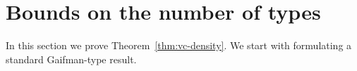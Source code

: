 \section{Bounds on the number of types}\label{sec:types}

In this section we prove Theorem~\ref{thm:vc-density}. 
We start with formulating a standard Gaifman-type result.
%
%
%

